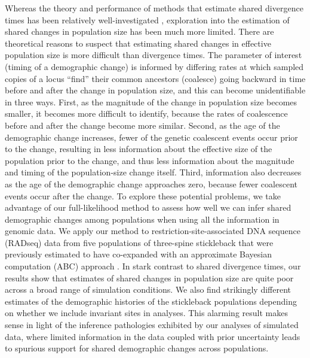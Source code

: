 Whereas the theory and performance of methods that estimate shared divergence
times has been relatively well-investigated
\citep[e.g.,][]{Oaks2012,Hickerson2013,Oaks2014reply,Oaks2014dpp,Overcast2017,Oaks2018ecoevolity},
exploration into the estimation of shared changes in population size has been
much more limited.
There are theoretical reasons to suspect that estimating shared changes in
effective population size is more difficult than divergence times.
The parameter of interest (timing of a demographic change) is informed by
differing rates at which sampled copies of a locus ``find'' their common
ancestors (coalesce) going backward in time before and after the change in
population size, and this can become unidentifiable in three ways.
First, as the magnitude of the change in population size becomes smaller, it
becomes more difficult to identify, because the rates of coalescence before and
after the change become more similar.
Second, as the age of the demographic change increases, fewer of the genetic
coalescent events occur prior to the change, resulting in less information
about the effective size of the population prior to the change, and thus less
information about the magnitude and timing of the population-size change
itself.
Third, information also decreases as the age of the demographic change
approaches zero, because fewer coalescent events occur after the change.
To explore these potential problems, we take advantage of our full-likelihood
method to assess how well we can infer shared demographic changes among
populations when using all the information in genomic data.
We apply our method to restriction-site-associated DNA sequence (RADseq) data
from five populations of three-spine stickleback
\citep[;][]{Hohenlohe2010}
that were previously estimated to have co-expanded with an approximate Bayesian
computation (ABC) approach \citep{Xue2015}.
In stark contrast to shared divergence times, our results show that estimates
of shared changes in population size are quite poor across a broad range of 
simulation conditions.
We also find strikingly different estimates of the demographic histories of the
stickleback populations depending on whether we include invariant sites in
analyses.
This alarming result makes sense in light of the inference pathologies
exhibited by our analyses of simulated data,
where limited information in the data coupled with prior uncertainty leads to
spurious support for shared demographic changes across populations.

\ifembed{

}{}

